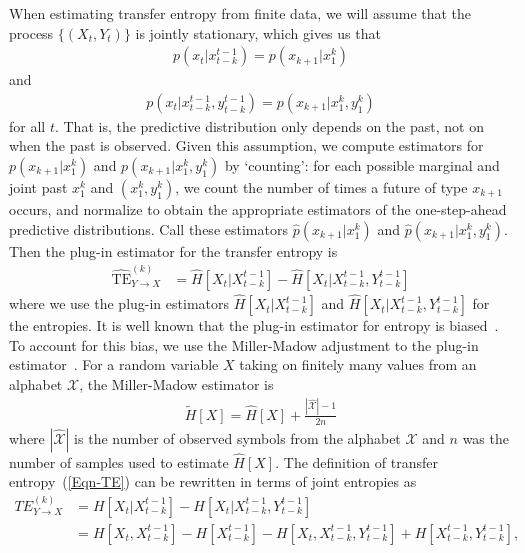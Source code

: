 When estimating transfer entropy from finite data, we will assume that the process $\{(X_{t}, Y_{t})\}$ is jointly stationary, which gives us that
\begin{align}
	p(x_{t} | x_{t-k}^{t-1}) = p(x_{k+1} | x_{1}^{k})
\end{align}
and
\begin{align}
	p(x_{t} | x_{t-k}^{t-1}, y_{t-k}^{t-1}) = p(x_{k+1} | x_{1}^{k}, y_{1}^{k})
\end{align}
for all $t$. That is, the predictive distribution only depends on the past, not on when the past is observed. Given this assumption, we compute estimators for $p(x_{k+1} | x_{1}^{k})$ and $p(x_{k+1} | x_{1}^{k}, y_{1}^{k})$ by `counting': for each possible marginal and joint past $x_{1}^{k}$ and $(x_{1}^{k}, y_{1}^{k})$, we count the number of times a future of type $x_{k+1}$ occurs, and normalize to obtain the appropriate estimators of the one-step-ahead predictive distributions. Call these estimators $\hat{p}(x_{k+1} | x_{1}^{k})$ and $\hat{p}(x_{k+1} | x_{1}^{k}, y_{1}^{k})$. Then the plug-in estimator for the transfer entropy is
\begin{align}
	\widehat{\text{TE}}_{Y \to X}^{(k)} &= \hat{H}\left[X_{t} | X_{t-k}^{t-1}\right] - \hat{H}\left[X_{t} | X_{t-k}^{t-1}, Y_{t-k}^{t-1}\right]
\end{align}
where we use the plug-in estimators $\hat{H}\left[X_{t} | X_{t-k}^{t-1}\right]$ and $\hat{H}\left[X_{t} | X_{t-k}^{t-1}, Y_{t-k}^{t-1}\right]$ for the entropies. It is well known that the plug-in estimator for entropy is biased~\cite{paninski2003estimation}. To account for this bias, we use the Miller-Madow adjustment to the plug-in estimator~\cite{miller1955note}. For a random variable $X$ taking on finitely many values from an alphabet $\mathcal{X}$, the Miller-Madow estimator is
	\begin{align}
		\tilde{H}[X] = \hat{H}[X] + \frac{|\hat{\mathcal{X}}| - 1}{2 n}
	\end{align}
	where $|\mathcal{\hat{X}}|$ is the number of observed symbols from the alphabet $\mathcal{X}$ and $n$ was the number of samples used to estimate $\hat{H}[X].$ The definition of transfer entropy~(\ref{Eqn-TE}) can be rewritten in terms of joint entropies as
	\begin{align}
		TE_{Y \to X}^{(k)} &= H[X_t | X_{t-k}^{t-1}] - H[X_t | X_{t-k}^{t-1},Y_{t-k}^{t-1}] \\ 
		&= H[X_t,X_{t-k}^{t-1}]-H[X_{t-k}^{t-1}]-H[X_t,X_{t-k}^{t-1},Y_{t-k}^{t-1}]+H[X_{t-k}^{t-1},Y_{t-k}^{t-1}],
	\end{align}
